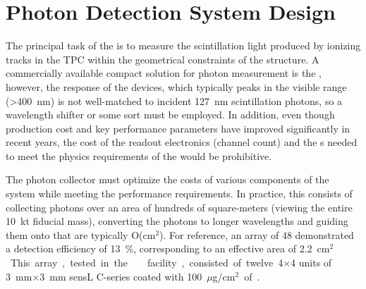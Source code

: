 \section{Photon Detection System Design}
\label{sec:fdsp-pd-design}


The principal task of the  is to measure the  scintillation light produced by ionizing tracks in the TPC within the geometrical constraints of the  structure. A commercially available compact solution for photon measurement is the , however, the response of the devices, which typically peaks in the visible range (>\SI{400}{nm}) is not well-matched to incident \SI{127}{nm} scintillation photons, so a wavelength shifter or some sort must be employed. 
In addition, even though production cost and key performance parameters have improved significantly in recent years, the cost of the readout electronics (channel count) and the s needed to meet the physics requirements of the  would be prohibitive. 

The photon collector must optimize the costs of various components of the system while meeting the performance requirements.  In practice, this consists of collecting  photons over an area of hundreds of square-meters (viewing the entire \SI{10}{kt} \lar fiducial mass), converting the photons to longer wavelengths and guiding them onto  that are typically O(cm$^2$). 
For reference, an array of \num{48}  demonstrated a detection efficiency of \SI{13}{\%}, corresponding to an effective area of \SI{2.2}{cm$^2$}. This array, tested in the \fnal {} \lar facility, consisted of twelve \num{4}$\times$\num{4} units of \SI{3}{mm}$\times$\SI{3}{mm} sensL C-series coated with \SI{100}{$\mu$g/cm$^2$} of . 



